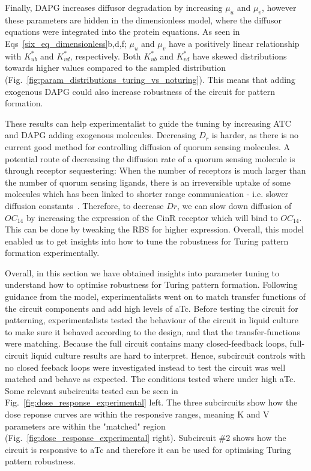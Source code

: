 Finally, DAPG increases diffusor degradation by increasing $\mu_u$ and $\mu_v$, however these parameters are hidden in the dimensionless model, where the diffusor equations were integrated into the protein equations.
As seen in Eqs~\ref{six_eq_dimensionless}b,d,f; $\mu_u$ and $\mu_v$ have a positively linear relationship with $K_{ub}^*$ and $K_{vd}^*$, respectively.
Both $K_{ub}^*$ and $K_{vd}^*$ have skewed distributions towards higher values compared to the sampled distribution (Fig.~\ref{fig:param_distributions_turing_vs_noturing}).
This means that adding exogenous DAPG could also increase robustness of the circuit for pattern formation. %

These results can help experimentalist to guide the tuning by increasing ATC and DAPG adding exogenous molecules.
Decreasing $D_{r}$ is harder, as there is no current good method for controlling diffusion of quorum sensing molecules.
A potential route of decreasing the diffusion rate of a quorum sensing molecule is through receptor sequestering: When the number of receptors is much larger than the number of quorum sensing ligands, there is an irreversible uptake of some molecules which has been linked to shorter range communication - i.e. slower diffusion constants~\parencite{vangestel}.
Therefore, to decrease $D{r}$, we can slow down diffusion of $OC_{14}$ by increasing the expression of the CinR receptor which will bind to $OC_{14}$.
This can be done by tweaking the RBS for higher expression.
Overall, this model enabled us to get insights into how to tune the robustness for Turing pattern formation experimentally.

Overall, in this section we have obtained insights into parameter tuning to understand how to optimise robustness for Turing pattern formation.
Following guidance from the model, experimentalists went on to match transfer functions of the circuit components and add high levels of aTc.
Before testing the circuit for patterning, experimentalists tested the behaviour of the circuit in liquid culture to make sure it behaved according to the design, and that the transfer-functions were matching.
Because the full circuit contains many closed-feedback loops, full-circuit liquid culture results are hard to interpret.
Hence, subcircuit controls with no closed feeback loops were investigated instead to test the circuit was well matched and behave as expected.
The conditions tested where under high aTc.
Some relevant subcircuits tested can be seen in Fig.~\ref{fig:dose_response_experimental} left.
The three subcircuits show how the dose reponse curves are within the responsive ranges, meaning K and V parameters are within the "matched" region (Fig.~\ref{fig:dose_response_experimental} right).
Subcircuit \#2 shows how the circuit is responsive to aTc and therefore it can be used for optimising Turing pattern robustness.

